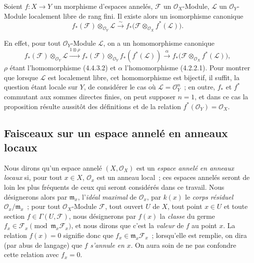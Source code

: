 \begin{env}[5.4.10]
\label{0.5.4.10-fr}
Soient $f:X\to Y$ un morphisme d'espaces annelés, $\mathcal{F}$ un
$\mathcal{O}_X$-Module, $\mathcal{L}$ un $\mathcal{O}_Y$-Module localement
libre de rang fini. Il existe alors un isomorphisme canonique
\[
  f_*(\mathcal{F})\otimes_{\mathcal{O}_Y}\mathcal{L}
  \xrightarrow{\sim}
  f_*\bigl(\mathcal{F}\otimes_{\mathcal{O}_X}f^*(\mathcal{L})\bigr).
  \tag{5.4.10.1}\label{0.5.4.10.1-fr}
\]


En effet, pour tout $\mathcal{O}_Y$-Module $\mathcal{L}$, on a un
homomorphisme canonique
\[
  f_*(\mathcal{F})\otimes_{\mathcal{O}_Y}\mathcal{L}
  \xrightarrow{1\otimes\rho}
  f_*(\mathcal{F})\otimes_{\mathcal{O}_Y}f_*(f^*(\mathcal{L}))
  \xrightarrow{\alpha}
  f_*\bigl(\mathcal{F}\otimes_{\mathcal{O}_X}f^*(\mathcal{L})\bigr),
\]
$\rho$ étant l'homomorphisme (4.4.3.2) et $\alpha$ l'homomorphisme (4.2.2.1).
Pour montrer que lorsque $\mathcal{L}$ est localement libre, cet homomorphisme
est bijectif, il suffit, la question étant locale sur $Y$, de considérer le
cas où $\mathcal{L}=\mathcal{O}_Y^n$~; en outre, $f_*$ et $f^*$ commutant aux
sommes directes finies, on peut supposer $n=1$, et dans ce cas la proposition
résulte aussitôt des définitions et de la relation
$f^*(\mathcal{O}_Y)=\mathcal{O}_X$.
\end{env}

\subsection{Faisceaux sur un espace annelé en anneaux locaux}
\label{subsection:0.5.5-fr}

\begin{env}[5.5.1]
\label{0.5.5.1-fr}
Nous dirons qu'un espace annelé $(X,\mathcal{O}_X)$ est un \emph{espace
annelé en anneaux locaux} si, pour tout $x\in X$, $\mathcal{O}_x$ est un
anneau local~; ces espaces annelés seront de loin les plus fréquents de ceux
qui seront considérés dans ce travail. Nous désignerons alors par
$\mathfrak{m}_x$, l'\emph{idéal maximal} de $\mathcal{O}_x$, par $k(x)$ le
\emph{corps résiduel} $\mathcal{O}_x/\mathfrak{m}_x$~; pour tout
$\mathcal{O}_X$-Module $\mathcal{F}$, tout ouvert $U$ de $X$, tout point
$x\in U$ et toute section $f\in\Gamma(U,\mathcal{F})$, nous désignerons par
$f(x)$ la \emph{classe} du germe
$f_x\in\mathcal{F}_x\pmod{\mathfrak{m}_x\mathcal{F}_x}$, et nous dirons que
c'est la \emph{valeur} de $f$ au point $x$. La relation $f(x)=0$ signifie
donc que $f_x\in\mathfrak{m}_x\mathcal{F}_x$~; lorsqu'elle est remplie, on dira
(par abus de langage) que $f$ \emph{s'annule en $x$}. On aura soin de ne pas
confondre cette relation avec $f_x=0$.
\end{env}


